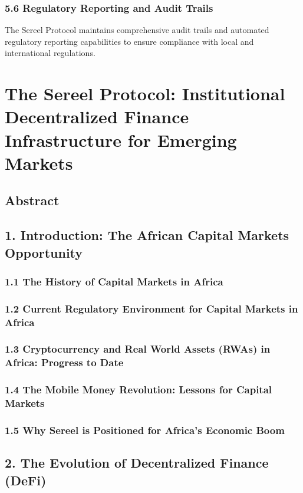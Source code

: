 \documentclass[12pt]{article}
\begin{document}
{{{\subsubsection{5.6 Regulatory Reporting and Audit Trails} %

The Sereel Protocol maintains comprehensive audit trails and automated regulatory reporting capabilities to ensure compliance with local and international regulations.


\section{The Sereel Protocol: Institutional Decentralized Finance Infrastructure for Emerging Markets} %
\subsection{Abstract} %
\subsection{1. Introduction: The African Capital Markets Opportunity} %
\subsubsection{1.1 The History of Capital Markets in Africa} %
\subsubsection{1.2 Current Regulatory Environment for Capital Markets in Africa} %
\subsubsection{1.3 Cryptocurrency and Real World Assets (RWAs) in Africa: Progress to Date} %
\subsubsection{1.4 The Mobile Money Revolution: Lessons for Capital Markets} %
\subsubsection{1.5 Why Sereel is Positioned for Africa's Economic Boom} %
\subsection{2. The Evolution of Decentralized Finance (DeFi)} %
}}}
\end{document}
